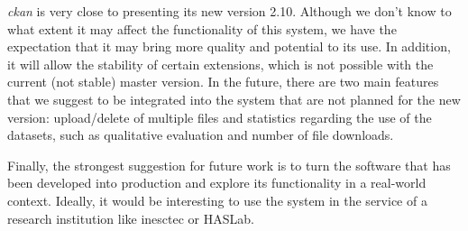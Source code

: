  \textit{\gls{ckan}} is very close to presenting its new version 2.10. Although we don't know to what extent it may affect the functionality of this system, we have the expectation that it may bring more quality and potential to its use. In addition, it will allow the stability of certain extensions, which is not possible with the current (not stable) master version. In the future, there are two main features that we suggest to be integrated into the system that are not planned for the new version: upload/delete of multiple files and statistics regarding the use of the datasets, such as qualitative evaluation and number of file downloads.

Finally, the strongest suggestion for future work is to turn the software that has been developed into production and explore its functionality in a real-world context. Ideally, it would be interesting to use the system in the service of a research institution like \gls{inesctec} or HASLab.